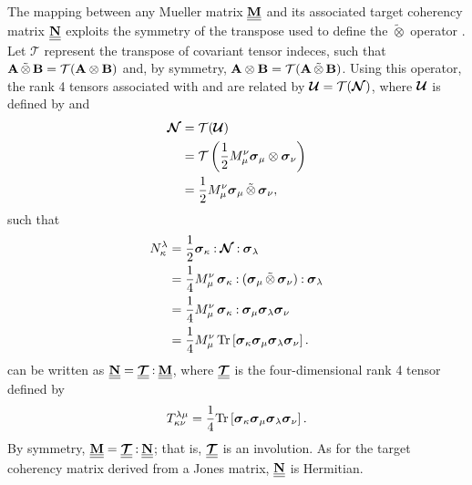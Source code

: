 The mapping between any Mueller matrix $\MM{M}$ and its associated target coherency matrix $\MM{N}$ exploits the symmetry of the transpose used to define the $\tilde\otimes$ operator .
%
Let $\mathcal{T}$ represent the transpose of covariant tensor indeces, such that
$\spinorBilinear{\bf A}{\bf B} = \mathcal{T}(\outerBilinear{\bf A}{\bf B})$ and, by symmetry,
$\outerBilinear{\bf A}{\bf B} = \mathcal{T}(\spinorBilinear{\bf A}{\bf B})$.  Using this operator, the rank 4 tensors associated with  and  are related by $\JT{U} = \mathcal{T}(\JT{N})$, where $\JT{U}$ is defined by 
and 
%
\begin{equation}
\begin{split}
\JT{N} & = \mathcal{T}(\JT{U}) \\
 & = \mathcal{T}\left( \frac{1}{2} M_\irow^\icol \outerBilinear{\pauli{\irow}}{\pauli{\icol}} \right) \\
 & = \frac{1}{2} M_\irow^\icol \spinorBilinear{\pauli{\irow}}{\pauli{\icol}},
\end{split}
\end{equation}
such that
\begin{equation}
\begin{split}
\label{eqn:Mueller_to_target_coherency}
N_\jrow^\jcol & = \frac{1}{2} \dc{\pauli{\jrow}}{\dc{ \JT{N} }{\pauli{\jcol}}} \\
& = \frac{1}{4} M_\irow^\icol \, \dc{\pauli{\jrow}}{\dc{\left( \spinorBilinear{\pauli{\irow}}{\pauli{\icol}} \right)}{\pauli{\jcol}}} \\
& = \frac{1}{4} M_\irow^\icol \, \dc{\pauli{\jrow}}{ \pauli{\irow}}{\pauli{\jcol}} {\pauli{\icol}} \\
& = \frac{1}{4} M_\irow^\icol \, \tr{ \pauli{\jrow} \pauli{\irow} \pauli{\jcol} \pauli{\icol} }. \\
\end{split}
\end{equation}
 can be written
as $\MM{N} = \MM{\JT{T}} \dcbo \MM{M}$, where $\MM{\JT{T}}$ is the
four-dimensional rank 4 tensor defined by
%
\begin{equation}
T_{\jrow\icol}^{\jcol\irow} = \frac{1}{4}  \tr{ \pauli{\jrow} \pauli{\irow} \pauli{\jcol} \pauli{\icol} }.
\end{equation}
By symmetry, $\MM{M} = \MM{\JT{T}} \dcbo \MM{N}$; that is, $\MM{\JT{T}}$ is an involution.
%
As for the target coherency matrix derived from a Jones matrix,
$\MM{N}$ is Hermitian.

